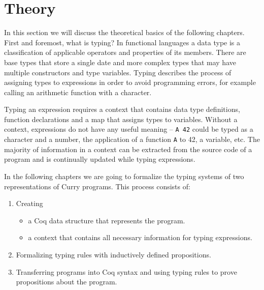 \documentclass[paper = a4, fleqn, twoside]{scrreprt}
\newcommand{\coqinline}[1]{\texttt{#1}}
\begin{document}
\section{Theory}
\label{theory}
In this section we will discuss the theoretical basics of the following chapters. First and foremost, what is typing?
In functional languages a data type is a classification of applicable operators and properties of its members. There are base types that store a single date and more complex types that may have multiple constructors and type variables. Typing describes the process of assigning types to expressions in order to avoid programming errors, for example calling an arithmetic function with a character.
\par \noindent
Typing an expression requires a context that contains data type definitions, function declarations and a map that assigns types to variables. Without a context, expressions do not have any useful meaning -- \coqinline{A 42} could be typed as a character and a number, the application of a function \coqinline{A} to 42, a variable, etc. The majority of information in a context can be extracted from the source code of a program and is continually updated while typing expressions.
\par \noindent
In the following chapters we are going to formalize the typing systems of two representations of Curry programs. This process consists of:
\begin{enumerate}
	\item Creating \begin{itemize}
		              \item a Coq data structure that represents the program.
		              \item a context that contains all necessary information for typing expressions.
		           \end{itemize}
	\item Formalizing typing rules with inductively defined propositions.
	\item Transferring programs into Coq syntax and using typing rules to prove propositions about the program.
\end{enumerate}
\end{document}
